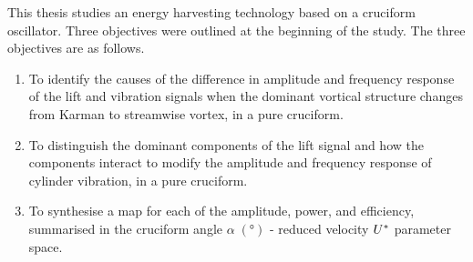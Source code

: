 \documentclass[oneside]{utmthesis}
\begin{document}


This thesis studies an energy harvesting technology based on a cruciform oscillator. Three objectives were outlined at the beginning of the study. The three objectives are as follows.

\begin{enumerate}
  \item To identify the causes of the difference in amplitude and frequency response of the lift and vibration signals when the dominant vortical structure changes from Karman to streamwise vortex, in a pure cruciform. \label{enum:whatHappens}

  \item To distinguish the dominant components of the lift signal and how the components interact to modify the amplitude and frequency response of cylinder vibration, in a pure cruciform. \label{enum:characteriseLift}

  \item To synthesise a map for each of the amplitude, power, and efficiency, summarised in the cruciform angle $\alpha \; (\si{\degree})$ - reduced velocity $U^{*}$ parameter space. \label{enum:passiveControl}
\end{enumerate}
\end{document}
